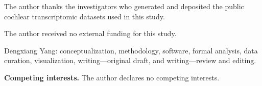 The author thanks the investigators who generated and deposited the public cochlear transcriptomic datasets used in this study.

The author received no external funding for this study.

Dengxiang Yang: conceptualization, methodology, software, formal analysis, data curation, visualization, writing---original draft, and writing---review and editing.

\noindent\textbf{Competing interests.} The author declares no competing interests.
